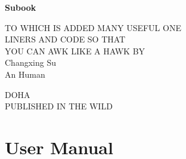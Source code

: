 \documentclass[]{subook}
\begin{document}
\pagestyle{empty}

\fullwidthpage
\setcounter{page}{0}



\begin{center}
\bfseries
\nbvspace[1]
\Huge
{\nbtitlestretch\huge
Subook}

\nbvspace[1]
\normalsize

TO WHICH IS ADDED MANY USEFUL ONE\\
LINERS AND CODE SO THAT\\
YOU CAN AWK LIKE A HAWK
\nbvspace[1]
\small BY\\
\Large Changxing Su\\[0.5em]
\footnotesize An Human 

\nbvspace[2]

\nbvspace[3]
\normalsize

DOHA\\
\large
PUBLISHED IN THE WILD
\nbvspace[1]
\end{center}


\cleardoublepage


\tableofcontents %
\listoffigures
\listoftables

\restoregeometry


\pagestyle{fancy} %

\newpage




\part{User Manual}







% 
\end{document}

